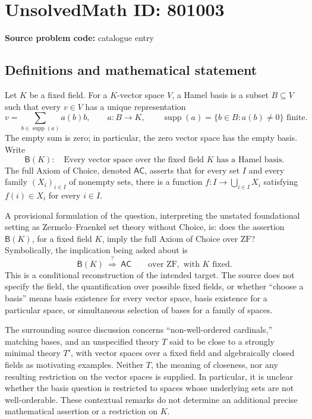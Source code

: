 \documentclass[11pt]{article}
\begin{document}
\section*{UnsolvedMath ID: 801003}
\textbf{Source problem code:} catalogue entry
\subsection{Definitions and mathematical statement}
Let \(K\) be a fixed field. For a \(K\)-vector space \(V\), a Hamel basis is a subset \(B\subseteq V\) such that every \(v\in V\) has a unique representation
\[
 v=\sum_{b\in\operatorname{supp}(a)}a(b)b,
 \qquad a:B\longrightarrow K,
 \qquad \operatorname{supp}(a)=\{b\in B:a(b)\ne0\}\text{ finite}.
\]
The empty sum is zero; in particular, the zero vector space has the empty basis. Write
\[
\mathsf{B}(K):\quad
\text{Every vector space over the fixed field }K\text{ has a Hamel basis}.
\]
The full Axiom of Choice, denoted \(\mathsf{AC}\), asserts that for every set \(I\) and every family \((X_i)_{i\in I}\) of nonempty sets, there is a function \(f:I\to\bigcup_{i\in I}X_i\) satisfying \(f(i)\in X_i\) for every \(i\in I\).

A provisional formulation of the question, interpreting the unstated foundational setting as Zermelo--Fraenkel set theory without Choice, is: does the assertion \(\mathsf{B}(K)\), for a fixed field \(K\), imply the full Axiom of Choice over \(\mathrm{ZF}\)? Symbolically, the implication being asked about is
\[
\mathsf{B}(K)\ \stackrel{?}{\Longrightarrow}\ \mathsf{AC}
\qquad\text{over }\mathrm{ZF},\text{ with }K\text{ fixed}.
\]
This is a conditional reconstruction of the intended target. The source does not specify the field, the quantification over possible fixed fields, or whether ``choose a basis'' means basis existence for every vector space, basis existence for a particular space, or simultaneous selection of bases for a family of spaces.

The surrounding source discussion concerns ``non-well-ordered cardinals,'' matching bases, and an unspecified theory \(T\) said to be close to a strongly minimal theory \(T'\), with vector spaces over a fixed field and algebraically closed fields as motivating examples. Neither \(T\), the meaning of closeness, nor any resulting restriction on the vector spaces is supplied. In particular, it is unclear whether the basis question is restricted to spaces whose underlying sets are not well-orderable. These contextual remarks do not determine an additional precise mathematical assertion or a restriction on \(K\).
\end{document}
